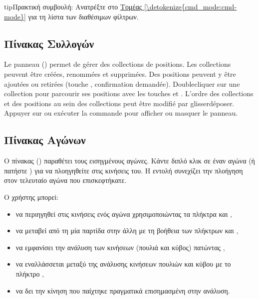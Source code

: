 \documentclass[letterpaper,10pt,greek]{sphinxmanual}
\begin{document}
\begin{sphinxadmonition}{tip}{Πρακτική συμβουλή:}
\sphinxAtStartPar
Ανατρέξτε στο \hyperref[\detokenize{cmd_mode:cmd-mode}]{Τομέας \ref{\detokenize{cmd_mode:cmd-mode}}} για τη λίστα των διαθέσιμων φίλτρων.
\end{sphinxadmonition}


\subsection{Πίνακας Συλλογών}
\label{\detokenize{manuel:panneau-collections}}\label{\detokenize{manuel:id6}}
\sphinxAtStartPar
Le panneau  () permet de gérer des collections de
positions. Les collections peuvent être créées, renommées et supprimées. Des
positions peuvent y être ajoutées ou retirées (touche , confirmation
demandée). Double\sphinxhyphen{}cliquer sur une collection pour parcourir ses positions
avec les touches  et . L’ordre des collections et des
positions au sein des collections peut être modifié par glisser\sphinxhyphen{}déposer.
Appuyer sur  ou exécuter la commande  pour afficher ou
masquer le panneau.


\subsection{Πίνακας Αγώνων}
\label{\detokenize{manuel:panneau-matchs}}\label{\detokenize{manuel:id7}}
\sphinxAtStartPar
Ο πίνακας  () παραθέτει τους εισηγμένους αγώνες. Κάντε διπλό κλικ σε έναν αγώνα (ή πατήστε ) για να πλοηγηθείτε στις κινήσεις του. Η εντολή  συνεχίζει την πλοήγηση στον τελευταίο αγώνα που επισκεφτήκατε.

\sphinxAtStartPar
Ο χρήστης μπορεί:
\begin{itemize}
\item {} 
\sphinxAtStartPar
να περιηγηθεί στις κινήσεις ενός αγώνα χρησιμοποιώντας τα πλήκτρα  και ,

\item {} 
\sphinxAtStartPar
να μεταβεί από τη μία παρτίδα στην άλλη με τη βοήθεια των πλήκτρων  και ,

\item {} 
\sphinxAtStartPar
να εμφανίσει την ανάλυση των κινήσεων (πουλιά και κύβος) πατώντας ,

\item {} 
\sphinxAtStartPar
να εναλλάσσεται μεταξύ της ανάλυσης κινήσεων πουλιών και κύβου με το πλήκτρο ,

\item {} 
\sphinxAtStartPar
να δει την κίνηση που παίχτηκε πραγματικά επισημασμένη στην ανάλυση.

\end{itemize}
\end{document}
